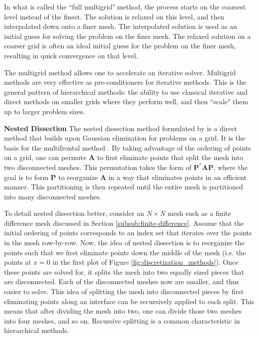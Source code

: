 In what is called the ``full multigrid" method, the process starts on the coarsest level instead of the finest. The solution is relaxed on this level, and then interpolated down onto a finer mesh. The interpolated solution is used as an initial guess for solving the problem on the finer mesh. The relaxed solution on a coarser grid is often an ideal initial guess for the problem on the finer mesh, resulting in quick convergence on that level.

The multigrid method allows one to accelerate an iterative solver. Multigrid methods are very effective as pre-conditioners for iterative methods. This is the general pattern of hierarchical methods: the ability to use classical iterative and direct methods on smaller grids where they perform well, and then ``scale" them up to larger problem sizes.


{\bf Nested Dissection}
The nested dissection method formulated by \cite{george1973nested} is a direct method that builds upon Gaussian elimination for problems on a grid. It is the basis for the multifrontal method \citep{liu1992multifrontal, davis2004algorithm}. By taking advantage of the ordering of points on a grid, one can permute $\textbf{A}$ to first eliminate points that split the mesh into two disconnected meshes. This permutation takes the form of $\textbf{P}^* \textbf{A} \textbf{P}$, where the goal is to form $\textbf{P}$ to reorganize $\textbf{A}$ in a way that eliminates points in an efficient manner. This partitioning is then repeated until the entire mesh is partitioned into many disconnected meshes.

To detail nested dissection better, consider an $N \times N$ mesh such as a finite difference mesh discussed in Section \ref{subsub:finite-difference}. Assume that the initial ordering of points corresponds to an index set that iterates over the points in the mesh row-by-row. Now, the idea of nested dissection is to reorganize the points such that we first eliminate points down the middle of the mesh (i.e. the points at $x = 0$ in the first plot of Figure \ref{fig:discretization_methods}). Once these points are solved for, it splits the mesh into two equally sized pieces that are disconnected. Each of the disconnected meshes now are smaller, and thus easier to solve. This idea of splitting the mesh into disconnected pieces by first eliminating points along an interface can be recursively applied to each split. This means that after dividing the mesh into two, one can divide those two meshes into four meshes, and so on. Recursive splitting is a common characteristic in hierarchical methods.

